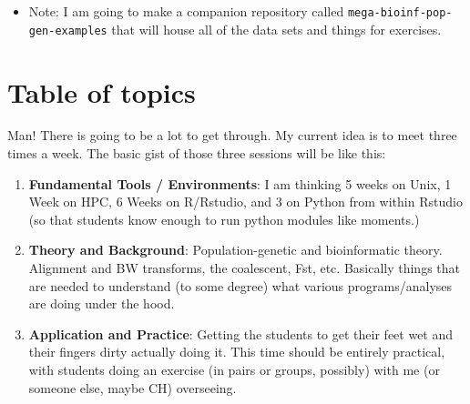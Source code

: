 \documentclass[]{krantz}
\providecommand{\tightlist}{%
  \setlength{\itemsep}{0pt}\setlength{\parskip}{0pt}}
\begin{document}
\begin{itemize}
\tightlist
\item
  Note: I am going to make a companion repository called \texttt{mega-bioinf-pop-gen-examples}
  that will house all of the data sets and things for exercises.
\end{itemize}

\hypertarget{table-of-topics}{%
\section{Table of topics}\label{table-of-topics}}

Man! There is going to be a lot to get through. My current idea
is to meet three times a week. The basic gist of those three sessions
will be like this:

\begin{enumerate}
\def\labelenumi{\arabic{enumi}.}
\item
  \textbf{Fundamental Tools / Environments}: I am thinking 5 weeks on Unix, 1 Week on HPC, 6 Weeks on R/Rstudio, and 3 on Python from within Rstudio (so that students know enough to run python modules like moments.)
\item
  \textbf{Theory and Background}: Population-genetic and bioinformatic theory. Alignment and BW transforms, the coalescent, Fst, etc. Basically things that are needed to understand (to some degree) what various programs/analyses are doing under the hood.
\item
  \textbf{Application and Practice}: Getting the students to get their feet wet and their fingers dirty actually doing it. This time should be entirely practical, with students doing an exercise (in pairs or groups, possibly) with me (or someone else, maybe CH) overseeing.
\end{enumerate}
\end{document}

